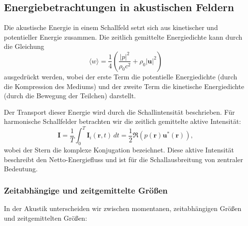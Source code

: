  
 

\subsection{Energiebetrachtungen in akustischen Feldern
\label{helmholtz:subsection:Energiebetrachtung}}

Die akustische Energie in einem Schallfeld setzt sich aus kinetischer
und potentieller Energie zusammen.
Die zeitlich gemittelte Energiedichte kann durch die Gleichung
\begin{equation}
\langle w \rangle
=
\frac{1}{4}\left(\frac{|p|^2}{\rho_0 c^2} + \rho_0 |\boldsymbol{u}|^2 \right)
\end{equation}
ausgedrückt werden,
wobei der erste Term die potentielle Energiedichte (durch die
Kompression des Mediums) und der zweite Term die kinetische
Energiedichte (durch die Bewegung der Teilchen) darstellt.

Der Transport dieser Energie wird durch die Schallintensität
beschrieben.
Für harmonische Schallfelder betrachten wir die zeitlich
gemittelte aktive Intensität:
\begin{equation}
\boldsymbol{I}
=
\frac{1}{T}\int_0^T \boldsymbol{I}_i(\boldsymbol{r},t)\,dt
=
\frac{1}{2}\Re (p(\boldsymbol{r}) \boldsymbol{u}^*(\boldsymbol{r})),
\end{equation}
wobei der Stern die komplexe Konjugation bezeichnet.
Diese aktive Intensität beschreibt den Netto-Energiefluss und ist für die Schallausbreitung von zentraler Bedeutung.

\subsubsection{Zeitabhängige und zeitgemittelte Größen}

In der Akustik unterscheiden wir zwischen momentanen, zeitabhängigen Größen und zeitgemittelten Größen:

